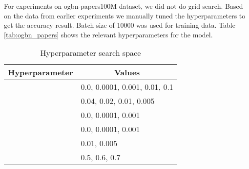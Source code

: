 \documentclass[sigconf,natbib=false]{acmart}
\begin{document}
For experiments on ogbn-papers100M dataset, we did not do grid search. Based on the data from earlier experiments we manually tuned the hyperparameters to get the accuracy result. Batch size of 10000 was used for training data. Table \ref{tab:ogbn_papers} shows the relevant hyperparameters for the model.


\begin{table}[h]
\centering
\caption{Hyperparameter search space}
\label{tab:param_search}
\begin{tabular}{ll} 
\toprule
\textbf{Hyperparameter} & \multicolumn{1}{c}{\textbf{Values}}  \\ 
\hline
\textbf{}          & 0.0, 0.0001, 0.001, 0.01, 0.1        \\
\textbf{}          & 0.04, 0.02, 0.01, 0.005              \\
\textbf{}          & 0.0, 0.0001, 0.001                   \\
\textbf{}          & 0.0, 0.0001, 0.001                   \\
\textbf{}           & 0.01, 0.005                          \\
\textbf{}        & 0.5, 0.6, 0.7                        \\
\bottomrule
\end{tabular}
\end{table}
\end{document}

